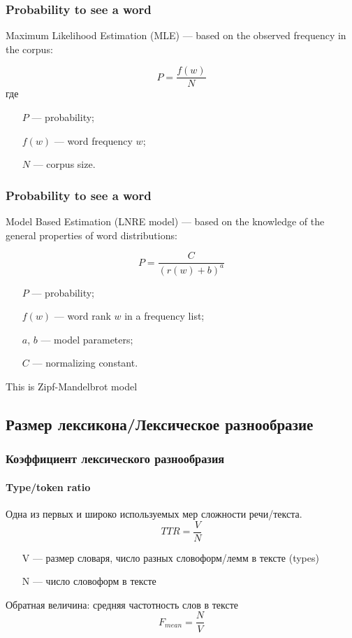 \documentclass[svgnames]{beamer}
\begin{document}
\begin{frame}
  \frametitle{Probability to see a word}

  Maximum Likelihood Estimation (MLE) — based on the observed
  frequency in the corpus:

  $$
  P = \frac{f(w)}{N}
  $$
  где 
  \begin{itemize}
  \item[$P$] — probability;
  \item[$f(w)$] — word frequency $w$;
  \item[$N$] — corpus size.
  \end{itemize}
\end{frame}

\begin{frame}
  \frametitle{Probability to see a word}

  Model Based Estimation (LNRE model) — based on the knowledge of the
  general properties of word distributions:

  $$
  P = \frac{C}{(r(w) + b)^a}
  $$
  \begin{itemize}
  \item[$P$] — probability;
  \item[$f(w)$] — word rank $w$ in a frequency list;
  \item[$a$, $b$] — model parameters;
  \item[$C$] — normalizing constant.
  \end{itemize}

  This is Zipf-Mandelbrot model
\end{frame}

\subsection{Размер лексикона/Лексическое разнообразие}

\begin{frame}
  \frametitle{Коэффициент лексического разнообразия}
  \framesubtitle{Type/token ratio}
  Одна из первых и широко используемых мер сложности речи/текста.
  \begin{equation}
    TTR = \frac{V}{N}
  \end{equation}
  \begin{itemize}
  \item[V] — размер словаря, число разных словоформ/лемм в тексте (types)
  \item[N] — число словоформ в тексте
  \end{itemize}
  \pause
  Обратная величина: средняя частотность слов в тексте
  \begin{equation}
    F_{mean} = \frac{N}{V}
  \end{equation}
\end{frame}
\end{document}
